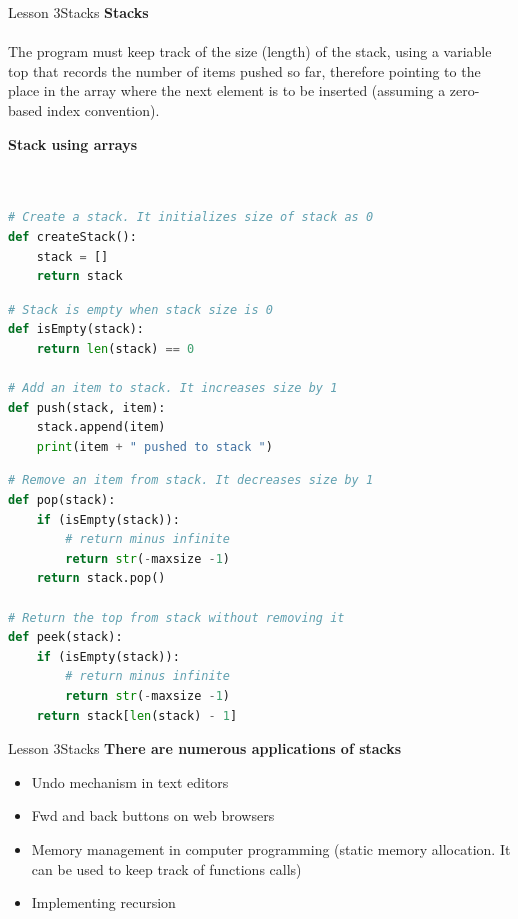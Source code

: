 \documentclass[aspectratio=1610]{beamer}
\begin{document}
\begin{frame}{Lesson 3}{Stacks}
\LARGE
\textbf{Stacks}\\~\\
The program must keep track of the size (length) of the stack, using
a variable top that records the number of items pushed so far,
therefore pointing to the place in the array where the next element
is to be inserted (assuming a zero-based index convention).
\end{frame}


\begin{frame}[fragile]
\Large
\textbf{Stack using arrays}\\~\\
\begin{lstlisting}[language=Python]

# Create a stack. It initializes size of stack as 0 
def createStack(): 
    stack = [] 
    return stack 
\end{lstlisting}
\end{frame}

\begin{frame}[fragile]
\Large
\begin{lstlisting}[language=Python]
# Stack is empty when stack size is 0 
def isEmpty(stack): 
    return len(stack) == 0

# Add an item to stack. It increases size by 1 
def push(stack, item): 
    stack.append(item) 
    print(item + " pushed to stack ")
 \end{lstlisting}
\end{frame} 
    
    
\begin{frame}[fragile]
\Large
\begin{lstlisting}[language=Python]    
# Remove an item from stack. It decreases size by 1 
def pop(stack): 
    if (isEmpty(stack)): 
        # return minus infinite
        return str(-maxsize -1) 
    return stack.pop() 

# Return the top from stack without removing it 
def peek(stack): 
    if (isEmpty(stack)): 
        # return minus infinite
        return str(-maxsize -1)  
    return stack[len(stack) - 1] 
 \end{lstlisting}
\end{frame}


\begin{frame}{Lesson 3}{Stacks}
\LARGE
\textbf{There are numerous applications of stacks}\\
\begin{itemize}
    \item Undo mechanism in text editors
    \item Fwd and back buttons on web browsers
    \item Memory management in computer programming (static memory allocation. It can be used to keep track of functions calls)
    \item Implementing \alert{recursion}
\end{itemize}
\end{frame}
\end{document}

